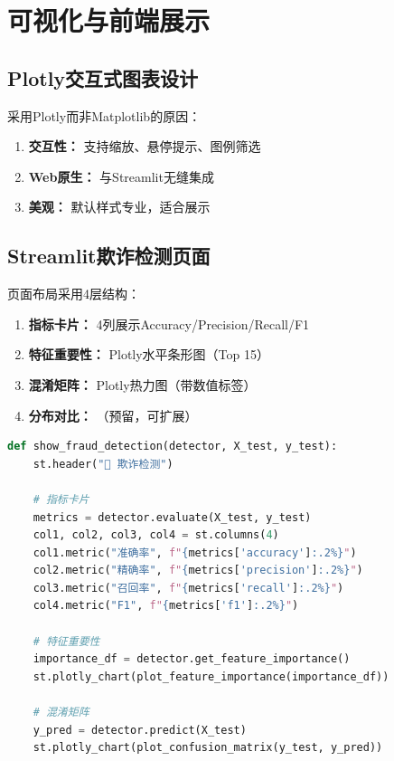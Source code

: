 \documentclass[12pt,a4paper]{article}
\begin{document}
\section{可视化与前端展示}

\subsection{Plotly交互式图表设计}

采用Plotly而非Matplotlib的原因：
\begin{enumerate}
    \item \textbf{交互性：} 支持缩放、悬停提示、图例筛选
    \item \textbf{Web原生：} 与Streamlit无缝集成
    \item \textbf{美观：} 默认样式专业，适合展示
\end{enumerate}

\subsection{Streamlit欺诈检测页面}

页面布局采用4层结构：
\begin{enumerate}
    \item \textbf{指标卡片：} 4列展示Accuracy/Precision/Recall/F1
    \item \textbf{特征重要性：} Plotly水平条形图（Top 15）
    \item \textbf{混淆矩阵：} Plotly热力图（带数值标签）
    \item \textbf{分布对比：} （预留，可扩展）
\end{enumerate}

\begin{lstlisting}[language=Python, caption=Streamlit欺诈检测页]
def show_fraud_detection(detector, X_test, y_test):
    st.header("🚨 欺诈检测")
    
    # 指标卡片
    metrics = detector.evaluate(X_test, y_test)
    col1, col2, col3, col4 = st.columns(4)
    col1.metric("准确率", f"{metrics['accuracy']:.2%}")
    col2.metric("精确率", f"{metrics['precision']:.2%}")
    col3.metric("召回率", f"{metrics['recall']:.2%}")
    col4.metric("F1", f"{metrics['f1']:.2%}")
    
    # 特征重要性
    importance_df = detector.get_feature_importance()
    st.plotly_chart(plot_feature_importance(importance_df))
    
    # 混淆矩阵
    y_pred = detector.predict(X_test)
    st.plotly_chart(plot_confusion_matrix(y_test, y_pred))
\end{lstlisting}
\end{document}
